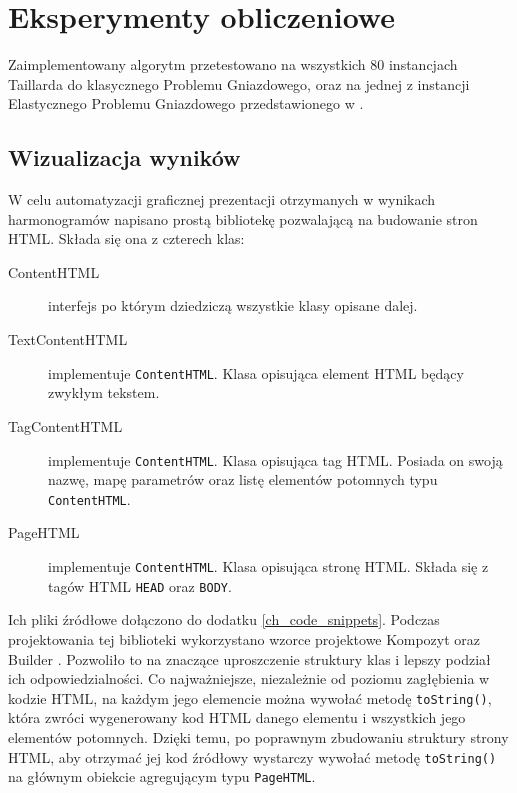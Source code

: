 \documentclass[printmode,oneside]{mgr}
\begin{document}
\chapter{Eksperymenty obliczeniowe \label{ch_experiments}}
Zaimplementowany algorytm przetestowano na wszystkich 80 instancjach Taillarda do klasycznego Problemu Gniazdowego, oraz na jednej z instancji Elastycznego Problemu Gniazdowego przedstawionego w \cite{Kacem2002a}.

\section{Wizualizacja wyników}
W celu automatyzacji graficznej prezentacji otrzymanych w wynikach harmonogramów napisano prostą bibliotekę pozwalającą na budowanie stron HTML. Składa się ona z czterech klas:
\begin{description}
    \item [ContentHTML] interfejs po którym dziedziczą wszystkie klasy opisane dalej.
    \item [TextContentHTML] implementuje \texttt{ContentHTML}. Klasa opisująca element HTML będący zwykłym tekstem.
    \item [TagContentHTML] implementuje \texttt{ContentHTML}. Klasa opisująca tag HTML. Posiada on swoją nazwę, mapę parametrów oraz listę  elementów potomnych typu \texttt{ContentHTML}.
    \item [PageHTML] implementuje \texttt{ContentHTML}. Klasa opisująca stronę HTML. Składa się z tagów HTML \texttt{HEAD} oraz \texttt{BODY}.
\end{description}
Ich pliki źródłowe dołączono do dodatku \ref{ch_code_snippets}. Podczas projektowania tej biblioteki wykorzystano wzorce projektowe Kompozyt oraz Builder \cite{GangOfFour}. Pozwoliło to na znaczące uproszczenie struktury klas i lepszy podział ich odpowiedzialności. Co najważniejsze, niezależnie od poziomu zagłębienia w kodzie HTML, na każdym jego elemencie można wywołać metodę \texttt{toString()}, która zwróci wygenerowany kod HTML danego elementu i wszystkich jego elementów potomnych. Dzięki temu, po poprawnym zbudowaniu struktury strony HTML, aby otrzymać jej kod źródłowy wystarczy wywołać metodę \texttt{toString()} na głównym obiekcie agregującym typu \texttt{PageHTML}.
%
\end{document}
